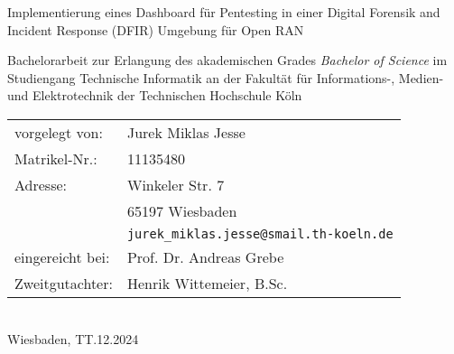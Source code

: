 \begin{titlepage}
    \sffamily%
    \begin{center}
    \end{center}
    \vfill
    \begin{huge}
        Implementierung eines Dashboard für Pentesting in einer Digital Forensik and Incident Response (DFIR) Umgebung für Open RAN\\[10mm]
    \end{huge}
    Bachelorarbeit zur Erlangung des akademischen Grades\newline
    \emph{Bachelor of Science}\newline
    im Studiengang Technische Informatik\newline
    an der Fakultät für Informations-, Medien- und Elektrotechnik\newline
    der Technischen Hochschule Köln
    \vfill
    \begin{tabular}{@{}ll}
        vorgelegt von:   & Jurek Miklas Jesse                             \\
        Matrikel-Nr.:    & 11135480                                       \\
        Adresse:         & Winkeler Str. 7                                \\
                         & 65197 Wiesbaden                                \\
                         & \texttt{jurek\_miklas.jesse@smail.th-koeln.de} \\[5mm]
        eingereicht bei: & Prof. Dr. Andreas Grebe                        \\
        Zweitgutachter:  & Henrik Wittemeier, B.Sc.
    \end{tabular}
    \\[10mm]
    Wiesbaden, TT.12.2024%
    \rmfamily%
\end{titlepage}